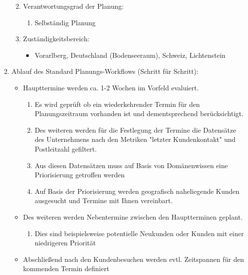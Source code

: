 \documentclass[Bachelorarbeit.tex]{subfiles}
\begin{document}
\begin{enumerate}
\begin{enumerate}
\begin{itemize}
		\end{itemize}
		\item Verantwortungsgrad der Planung:
		\begin{enumerate}
			\item[] Selbständig Planung
		\end{enumerate}
		\item Zuständigkeitsbereich:
		\begin{itemize}
			\item[] Vorarlberg, Deutschland (Bodenseeraum), Schweiz, Lichtenstein
		\end{itemize}
	\end{enumerate}
	\item Ablauf des Standard Planungs-Workflows (Schritt für Schritt):
	\begin{itemize}
		\item[] Haupttermine werden ca. 1-2 Wochen im Vorfeld evaluiert. 
		\begin{enumerate}
			\item Es wird geprüft ob ein wiederkehrender Termin für den Planungszeitraum vorhanden ist und dementsprechend berücksichtigt.
			\item Des weiteren werden für die Festlegung der Termine die Datensätze des Unternehmens nach den Metriken "letzter Kundenkontakt" und Postleitzahl  gefiltert.
			\item Aus diesen Datensätzen muss auf Basis von Domänenwissen eine Priorisierung getroffen werden
			\item Auf Basis der Priorisierung werden geografisch naheliegende Kunden ausgesucht und Termine mit Ihnen vereinbart.
		\end{enumerate}
		\item[] Des weiteren werden Nebentermine zwischen den Hauptterminen geplant.
		\begin{enumerate}
			\item Dies sind beispielsweise potentielle Neukunden oder Kunden mit einer niedrigeren Priorität 
		\end{enumerate}
		\item[] Abschließend nach den Kundenbesuchen werden evtl. Zeitspannen für den kommenden Termin definiert
	\end{itemize}
	

\end{enumerate}
\end{document}
